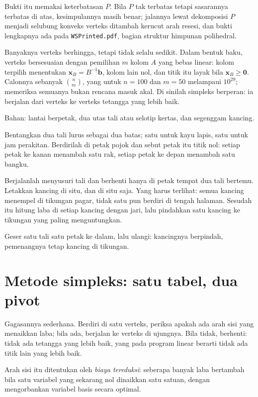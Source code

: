 Bukti itu memakai keterbatasan $P$. Bila $P$ tak terbatas tetapi sasarannya
terbatas di atas, kesimpulannya masih benar; jalannya lewat dekomposisi $P$ menjadi selubung
konveks verteks ditambah kerucut arah resesi, dan bukti lengkapnya ada pada
\texttt{WSPrinted.pdf}, bagian struktur himpunan polihedral.

Banyaknya verteks berhingga, tetapi tidak selalu sedikit. Dalam bentuk baku,
verteks bersesuaian dengan pemilihan $m$ kolom $A$ yang bebas linear: kolom terpilih
menentukan $\mathbf{x}_{B}=B^{-1}\mathbf{b}$, kolom lain nol, dan titik itu layak bila
$\mathbf{x}_{B}\ge\mathbf{0}$. Calonnya sebanyak $\binom{n}{m}$, yang untuk $n=100$ dan
$m=50$ melampaui $10^{29}$; memeriksa semuanya bukan rencana masuk akal. Di sinilah simpleks
berperan: ia berjalan dari verteks ke verteks tetangga yang lebih baik.

\begin{tangan}
Bahan: lantai berpetak, dua utas tali atau selotip kertas, dan segenggam kancing.

Bentangkan dua tali lurus sebagai dua batas; satu untuk kayu lapis, satu untuk jam
perakitan. Berdirilah di petak pojok dan sebut petak itu titik nol: setiap petak ke kanan
menambah satu rak, setiap petak ke depan menambah satu bangku.

Berjalanlah menyusuri tali dan berhenti hanya di petak tempat dua tali bertemu. Letakkan
kancing di situ, dan di situ saja. Yang harus terlihat: semua kancing menempel di tikungan
pagar, tidak satu pun berdiri di tengah halaman. Sesudah itu hitung laba di setiap kancing
dengan jari, lalu pindahkan satu kancing ke tikungan yang paling menguntungkan.

Geser satu tali satu petak ke dalam, lalu ulangi: kancingnya berpindah, pemenangnya tetap
kancing di tikungan.
\end{tangan}

\section{Metode simpleks: satu tabel, dua pivot}

Gagasannya sederhana. Berdiri di satu verteks, periksa apakah ada arah sisi yang menaikkan
laba; bila ada, berjalan ke verteks di ujungnya. Bila tidak, berhenti: tidak ada tetangga
yang lebih baik, yang pada program linear berarti tidak ada titik lain yang lebih baik.

Arah sisi itu ditentukan oleh \emph{biaya tereduksi}: seberapa banyak laba bertambah bila
satu variabel yang sekarang nol dinaikkan satu satuan, dengan mengorbankan variabel basis
secara optimal.

